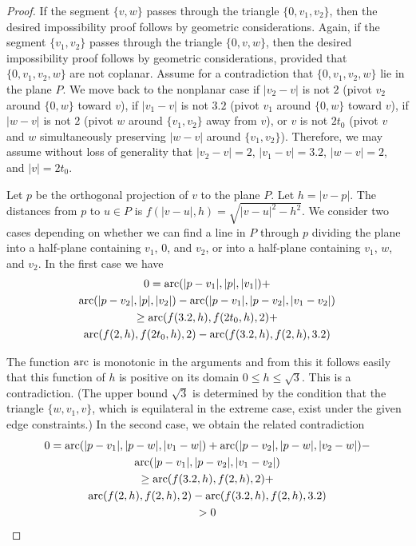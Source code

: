 \begin{proof}
If the segment $\{v,w\}$ passes through the triangle $\{0,v_1,v_2\}$,
then the desired impossibility proof follows by geometric
considerations. Again, if the segment $\{v_1,v_2\}$ passes through
the triangle $\{0,v,w\}$, then the desired impossibility proof
follows by geometric considerations, provided that $\{0,v_1,v_2,w\}$
are not coplanar. Assume for a contradiction that $\{0,v_1,v_2,w\}$
lie in the plane $P$. We move back to the nonplanar case if
$|v_2-v|$ is not $2$ (pivot $v_2$ around $\{0,w\}$ toward $v$), if
$|v_1-v|$ is not $3.2$ (pivot $v_1$ around $\{0,w\}$ toward $v$), if
$|w-v|$ is not $2$ (pivot $w$ around $\{v_1,v_2\}$ away from $v$),
or $v$ is not $2t_0$ (pivot $v$ and $w$ simultaneously preserving
$|w-v|$ around $\{v_1,v_2\}$).  Therefore, we may assume without
loss of generality that $|v_2-v|=2$, $|v_1-v|=3.2$, $|w-v|=2$, and
$|v|=2t_0$.

Let $p$ be the orthogonal projection of $v$ to the plane $P$.  Let
$h=|v-p|$. The distances from $p$ to $u\in P$ is
$f(|v-u|,h)=\sqrt{|v-u|^2-h^2}$. We consider two cases depending
on whether we can find a line in $P$ through $p$ dividing the
plane into a half-plane containing $v_1$, $0$, and $v_2$, or into
a half-plane containing $v_1$, $w$, and $v_2$.  In the first case
we have
\begin{multline}
    0=\operatorname{arc}(|p-v_1|,|p|,|v_1|)+\\
    \operatorname{arc}(|p-v_2|,|p|,|v_2|)-\operatorname{arc}(|p-v_1|,|p-v_2|,|v_1-v_2|)\\
    \ge \operatorname{arc}(f(3.2,h),f(2t_0,h),2)+\\
    \operatorname{arc}(f(2,h),f(2t_0,h),2)-\operatorname{arc}(f(3.2,h),f(2,h),3.2)
\end{multline}

The function $\operatorname{arc}$ is monotonic in the arguments and from this it
follows easily that this function of $h$ is positive on its domain
$0\le h\le \sqrt3$. This is a contradiction. (The upper bound
$\sqrt3$ is determined by the condition that the triangle
$\{w,v_1,v\}$, which is equilateral in the extreme case, exist under
the given edge constraints.) In the second case, we obtain the
related contradiction
\begin{multline}
    0=\operatorname{arc}(|p-v_1|,|p-w|,|v_1-w|)+
    \operatorname{arc}(|p-v_2|,|p-w|,|v_2-w|)-\\
    \operatorname{arc}(|p-v_1|,|p-v_2|,|v_1-v_2|)\\
    \ge \operatorname{arc}(f(3.2,h),f(2,h),2)+\\
    \operatorname{arc}(f(2,h),f(2,h),2)-\operatorname{arc}(f(3.2,h),f(2,h),3.2)
\\>0
\end{multline}


\end{proof}
